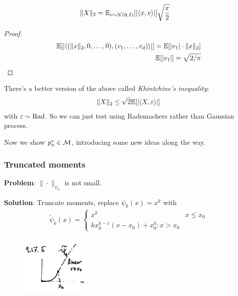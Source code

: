 \begin{lemma}
  \begin{align}
    \|X\|_2 &= \mathbb{E}_{v \sim \mathcal{N}(0,I)}[\lvert\braket{x,v}\rvert] \sqrt{\frac{\pi}{2}}
  \end{align}
\end{lemma}
\begin{proof}
  \begin{align}
    \mathbb{E}[\lvert
    \braket{
      (\|x\|_2, 0, \ldots, 0),
      (v_1,\ldots, v_d)
    } \rvert]
    = \mathbb{E}[\lvert v_1 \rvert \cdot \|x\|_2] \\
    \mathbb{E}[\lvert v_1\rvert] = \sqrt{2/\pi}
  \end{align}
\end{proof}

\begin{remark}
  There's a better version of the above called \emph{Khintchine's inequality}:
  \begin{align}
    \|X\|_2 \leq \sqrt{2} \mathbb{E}[\lvert \braket{X, \varepsilon} \rvert]
  \end{align}
  with $\varepsilon \sim \text{Rad}$. So we can just test using Rademachers rather
  than Gaussian process.
\end{remark}


Now we show $p_n^* \in \mathcal{M}$, introducing some new ideas along the way.

\subsubsection{Truncated moments}

\textbf{Problem}: $\| \cdot \|_{\psi_k}$ is not small.

\textbf{Solution}: Truncate moments, replace $\psi_k(x) = x^k$ with
\begin{align}
  \tilde{\psi}_k(x) = \begin{cases}
    x^k & x \leq x_0 \\
    k x_0^{k-1} (x - x_0) + x_0^k : x > x_0
  \end{cases}
\end{align}


\begin{figure}[H]
\begin{center}
  \includegraphics[width=0.3\textwidth]{figures/9-17-5.png}
\end{center}
\end{figure}

